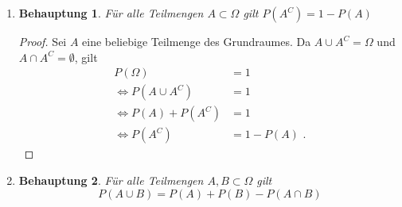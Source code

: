 \documentclass[a4paper]{scrartcl}
\newtheorem*{behaupt}{Behauptung}
\newcommand{\gdw}{\Leftrightarrow}
\begin{document}
\begin{enumerate}[label=\bfseries\arabic*.]
\begin{enumerate}[label=(\roman*)]
\begin{proof}[Beweis durch vollständige Induktion]
                    
                \end{proof}

            \item
                \begin{behaupt}
                    Für alle Teilmengen $A \subset \Omega$ gilt
                    $P(A^C) = 1 - P(A)$
                \end{behaupt}
                \begin{proof}
                    Sei $A$ eine beliebige Teilmenge des Grundraumes.
                    Da $A \cup A^C = \Omega$ und $A \cap A^C = \emptyset$, gilt
                    \begin{equation}
                        \begin{split}
                            P(\Omega) &= 1 \\
                            \gdw P(A \cup A^C) &= 1 \\
                            \gdw P(A) + P(A^C) &= 1 \\
                            \gdw P(A^C) &= 1 - P(A) \text{ .}
                        \end{split}
                    \end{equation}
                \end{proof}

            \setcounter{enumii}{4}
            \item
                \begin{behaupt}
                    Für alle Teilmengen $A, B \subset \Omega$ gilt
				\begin{equation}
                    P(A \cup B) = P(A) + P(B) - P(A \cap B)
				\end{equation}                    


\end{behaupt}
\end{enumerate}
\end{enumerate}
\end{document}
